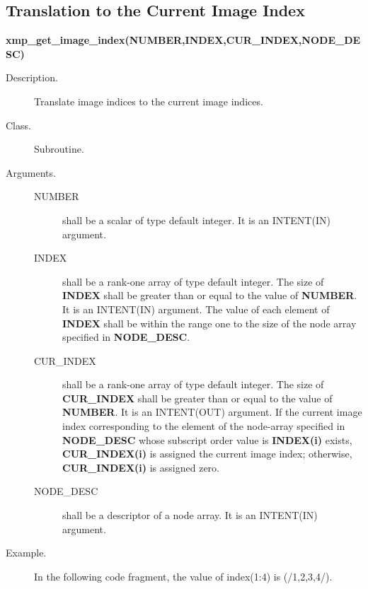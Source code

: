 \subsection{Translation to the Current Image Index}

{\bf xmp\_get\_image\_index(NUMBER,INDEX,CUR\_INDEX,NODE\_DESC)}

\begin{description}
 \item[Description.] Translate image indices to the current image indices.

 \item[Class.] Subroutine.
	    
 \item[Arguments.] \hspace{1cm}
	    \begin{description}
	     \item[NUMBER] shall be a scalar of type default integer. It is an INTENT(IN) argument.
	     \item[INDEX] shall be a rank-one array of type default integer.
			The size of {\bfseries INDEX} shall be
			greater than or equal to the value of {\bfseries NUMBER}.
			It is an INTENT(IN) argument.
			The value of each element of {\bfseries INDEX} shall be
					within 
			the range one
			to the size of the node array specified 
			in {\bfseries NODE\_DESC}.
	     \item[CUR\_INDEX] shall be a rank-one array of type default integer.
			The size of {\bfseries CUR\_INDEX} shall be
			greater than or equal to the value of {\bfseries NUMBER}.
			It is an INTENT(OUT) argument.
			If the current image index 
			corresponding to the element of the node-array
			specified in {\bfseries NODE\_DESC}
			whose subscript order value is {\bfseries INDEX(i)}
			exists,
			{\bfseries CUR\_INDEX(i)} is assigned the current image index;
			otherwise, {\bfseries CUR\_INDEX(i)} is assigned zero.
	     \item[NODE\_DESC] shall be a descriptor of a
			node array. It is an INTENT(IN) argument.
	    \end{description}

 \item[Example.] 
In the following code fragment, the value of {\ttfamily index(1:4)} is {\ttfamily (/1,2,3,4/)}.
\end{description}


